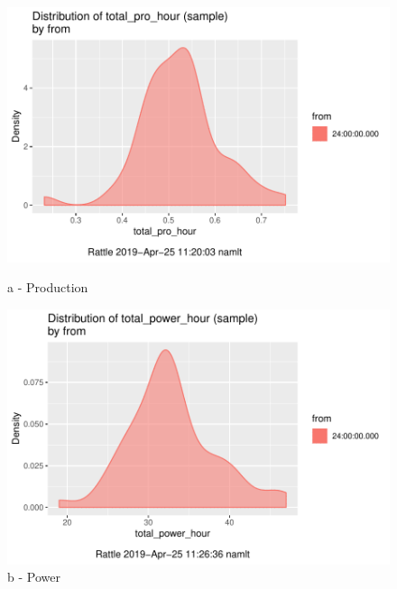 \begin{figure}[!htb]
	\begin{minipage}[b]{0.3\linewidth}
		\centering
		\includegraphics[width=\textwidth]{figures/distribution_production}
		\caption*{a - Production}
	\end{minipage}
	\hspace{0.05cm}
	\begin{minipage}[b]{0.3\linewidth}
		\centering
		\includegraphics[width=\textwidth]{figures/distribution_power}
		\caption*{b - Power}
	\end{minipage}
	\hspace{0.05cm}
	\begin{minipage}[b]{0.3\linewidth}
		\centering

\end{minipage}
\end{figure}
